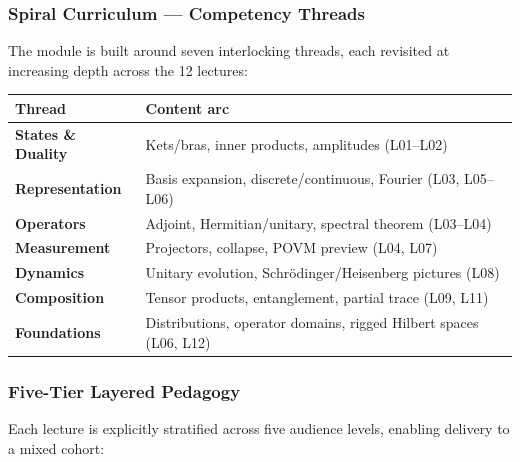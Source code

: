 \documentclass[11pt,a4paper]{article}
\begin{document}
\subsubsection*{Spiral Curriculum --- Competency Threads}

The module is built around seven interlocking threads, each revisited at increasing depth
across the 12 lectures:

\begin{center}
\begin{tabular}{lp{10cm}}
\toprule
\textbf{Thread} & \textbf{Content arc}\\
\midrule
\textbf{States \& Duality} & Kets/bras, inner products, amplitudes (L01--L02)\\
\textbf{Representation} & Basis expansion, discrete/continuous, Fourier (L03, L05--L06)\\
\textbf{Operators} & Adjoint, Hermitian/unitary, spectral theorem (L03--L04)\\
\textbf{Measurement} & Projectors, collapse, POVM preview (L04, L07)\\
\textbf{Dynamics} & Unitary evolution, Schr\"odinger/Heisenberg pictures (L08)\\
\textbf{Composition} & Tensor products, entanglement, partial trace (L09, L11)\\
\textbf{Foundations} & Distributions, operator domains, rigged Hilbert spaces (L06, L12)\\
\bottomrule
\end{tabular}
\end{center}

\subsubsection*{Five-Tier Layered Pedagogy}

Each lecture is explicitly stratified across five audience levels, enabling delivery
to a mixed cohort:
\end{document}
